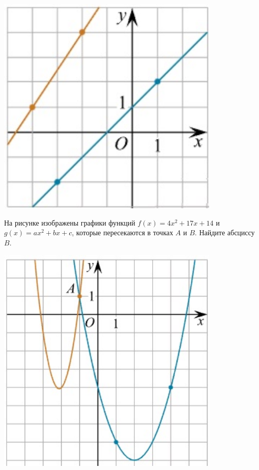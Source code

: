 \begin{listofex}
\begin{minipage}[c]{0.3\textwidth}
		\includegraphics[align=b, width=0.8\textwidth]{pics/G111M3E-1}
	\end{minipage}
	\item \begin{minipage}[t]{0.66\textwidth}
		На рисунке изображены графики функций \( f(x)=4x^2+17x+14 \) и \( g(x)=ax^2+bx+c \), которые пересекаются в точках \(A\) и \(B\). Найдите абсциссу  \( B \).
	\end{minipage}
	\begin{minipage}[c]{0.3\textwidth}
		\includegraphics[align=b, width=0.8\textwidth]{pics/G111M3E-2}
	\end{minipage}
\end{listofex}
%	
